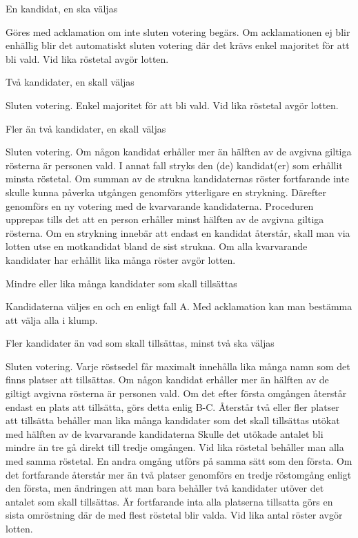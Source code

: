 \documentclass[10pt]{article}
\begin{document}
\begin{alphlist}
\item En kandidat, en ska väljas

Göres med acklamation om inte sluten votering begärs. Om acklamationen ej blir
enhällig blir det automatiskt sluten votering där det krävs enkel majoritet
för att bli vald. Vid lika röstetal avgör lotten.
\item Två kandidater, en skall väljas

Sluten votering. Enkel majoritet för att bli vald. Vid lika röstetal avgör
lotten.
\item Fler än två kandidater, en skall väljas

Sluten votering. Om någon kandidat erhåller mer än hälften av de avgivna
giltiga rösterna är personen vald. I annat fall stryks den (de) kandidat(er)
som erhållit minsta röstetal. Om summan av de strukna kandidaternas röster
fortfarande inte skulle kunna påverka utgången genomförs ytterligare en
strykning. Därefter genomförs en ny votering med de kvarvarande kandidaterna.
Proceduren upprepas tills det att en person erhåller minst hälften av de
avgivna giltiga rösterna. Om en strykning innebär att endast en kandidat
återstår, skall man via lotten utse en motkandidat bland de sist strukna.
Om alla kvarvarande kandidater har erhållit lika många röster avgör lotten.
\item Mindre eller lika många kandidater som skall tillsättas

Kandidaterna väljes en och en enligt fall A. Med acklamation kan man bestämma
att välja alla i klump.
\item Fler kandidater än vad som skall tillsättas, minst två ska väljas

Sluten votering. Varje röstsedel får maximalt innehålla lika många namn som
det finns platser att tillsättas. Om någon kandidat erhåller mer än hälften
av de giltigt avgivna rösterna är personen vald. Om det efter första omgången
återstår endast en plats att tillsätta, görs detta enlig B-C. Återstår två
eller fler platser att tillsätta behåller man lika många kandidater som det
skall tillsättas utökat med hälften av de kvarvarande kandidaterna Skulle
det utökade antalet bli mindre än tre gå direkt till tredje omgången. Vid
lika röstetal behåller man alla med samma röstetal. En andra omgång utförs på
samma sätt som den första. Om det fortfarande återstår mer än två platser
genomförs en tredje röstomgång enligt den första, men ändringen att man bara
behåller två kandidater utöver det antalet som skall tillsättas. Är
fortfarande inta alla platserna tillsatta görs en sista omröstning där de med
flest röstetal blir valda. Vid lika antal röster avgör lotten.
\end{alphlist}
\end{document}
